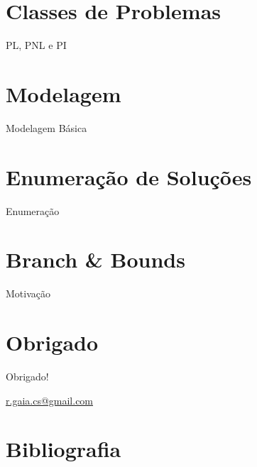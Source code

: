 \documentclass[11pt]{beamer}
\begin{document}
\section{Classes de Problemas}
\begin{frame}{PL, PNL e PI}
  \begin{center}
  \end{center}
\end{frame}

\section{Modelagem}
\begin{frame}
  Modelagem Básica
\end{frame}

\section{Enumeração de Soluções}
\begin{frame}
  Enumeração
\end{frame}

\section{Branch \& Bounds}
\begin{frame}
  Motivação
\end{frame}

\section*{Obrigado}
\begin{frame}
  \begin{center}
    Obrigado!
  \end{center}
  \begin{center}
    \url{r.gaia.cs@gmail.com}
  \end{center}
\end{frame}

\section*{Bibliografia}
\begin{frame}
  \nocite{wolsey1998integer}
  
  
\end{frame}
\end{document}
